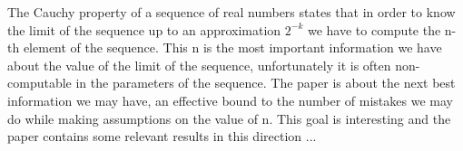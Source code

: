 The Cauchy property of a sequence of real numbers states that in order to know the limit of the sequence up to an approximation $2^{-k}$ we have to compute the n-th element of the sequence. This n is the most important information we have about the value of the limit of the sequence, unfortunately it is often non-computable in the parameters of the sequence. The paper is about the next best information we may have, an effective bound to the number of mistakes we may do while making assumptions on the value of n. This goal is interesting and the paper contains some relevant results in this direction ...
